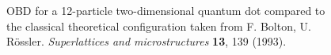 \begin{frame}
 \begin{figure}
 \begin{center}
  \label{fig:wigner20}
  \caption{OBD for a 12-particle two-dimensional quantum dot compared to the classical theoretical configuration taken from F. Bolton, U. Rössler.  \textit{Superlattices and microstructures} \textbf{13}, 139 (1993).}
 \end{center}
\end{figure}
\end{frame}

